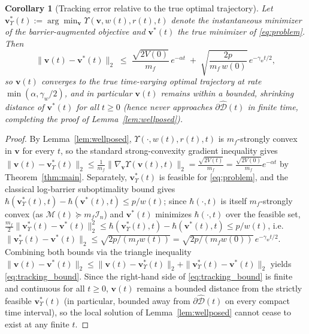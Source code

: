 \documentclass[fleqn,10pt]{wlscirep}
\newtheorem{corollary}{Corollary}
\begin{document}
\begin{corollary}[Tracking error relative to the true optimal trajectory]\label{cor:tracking}
Let $\bm{v}^*_\Upsilon(t):=\arg\min_{\bm{v}}\Upsilon(\bm{v},w(t),r(t),t)$ denote the instantaneous minimizer of the barrier-augmented objective and $\bm{v}^*(t)$ the true minimizer of \eqref{eq:problem}. Then
\begin{equation}
\|\bm{v}(t)-\bm{v}^*(t)\|_2 \;\leq\; \frac{\sqrt{2V(0)}}{m_f}\,e^{-\alpha t} \;+\; \sqrt{\frac{2p}{m_f\,w(0)}}\,e^{-\gamma_w t/2},
\label{eq:tracking_bound}
\end{equation}
so $\bm{v}(t)$ converges to the true time-varying optimal trajectory at rate $\min(\alpha,\gamma_w/2)$, and in particular $\bm{v}(t)$ remains within a bounded, shrinking distance of $\bm{v}^*(t)$ for all $t\geq0$ (hence never approaches $\partial\widehat{\mathcal{D}}(t)$ in finite time, completing the proof of Lemma~\ref{lem:wellposed}).
\end{corollary}
\begin{proof}
By Lemma~\ref{lem:wellposed}, $\Upsilon(\cdot,w(t),r(t),t)$ is $m_f$-strongly convex in $\bm{v}$ for every $t$, so the standard strong-convexity gradient inequality gives $\|\bm{v}(t)-\bm{v}^*_\Upsilon(t)\|_2\leq\frac{1}{m_f}\|\nabla_{\bm{v}}\Upsilon(\bm{v}(t),t)\|_2=\frac{\sqrt{2V(t)}}{m_f}=\frac{\sqrt{2V(0)}}{m_f}e^{-\alpha t}$ by Theorem~\ref{thm:main}. Separately, $\bm{v}^*_\Upsilon(t)$ is feasible for \eqref{eq:problem}, and the classical log-barrier suboptimality bound \cite{book12} gives $\hbar(\bm{v}^*_\Upsilon(t),t)-\hbar(\bm{v}^*(t),t)\leq p/w(t)$; since $\hbar(\cdot,t)$ is itself $m_f$-strongly convex (as $\mathcal{M}(t)\succeq m_f\mathcal{I}_n$) and $\bm{v}^*(t)$ minimizes $\hbar(\cdot,t)$ over the feasible set, $\frac{m_f}{2}\|\bm{v}^*_\Upsilon(t)-\bm{v}^*(t)\|_2^2\leq\hbar(\bm{v}^*_\Upsilon(t),t)-\hbar(\bm{v}^*(t),t)\leq p/w(t)$, i.e. $\|\bm{v}^*_\Upsilon(t)-\bm{v}^*(t)\|_2\leq\sqrt{2p/(m_f w(t))}=\sqrt{2p/(m_f w(0))}\,e^{-\gamma_w t/2}$. Combining both bounds via the triangle inequality $\|\bm{v}(t)-\bm{v}^*(t)\|_2\leq\|\bm{v}(t)-\bm{v}^*_\Upsilon(t)\|_2+\|\bm{v}^*_\Upsilon(t)-\bm{v}^*(t)\|_2$ yields \eqref{eq:tracking_bound}. Since the right-hand side of \eqref{eq:tracking_bound} is finite and continuous for all $t\geq0$, $\bm{v}(t)$ remains a bounded distance from the strictly feasible $\bm{v}^*_\Upsilon(t)$ (in particular, bounded away from $\partial\widehat{\mathcal{D}}(t)$ on every compact time interval), so the local solution of Lemma~\ref{lem:wellposed} cannot cease to exist at any finite $t$.
\end{proof}
\end{document}
